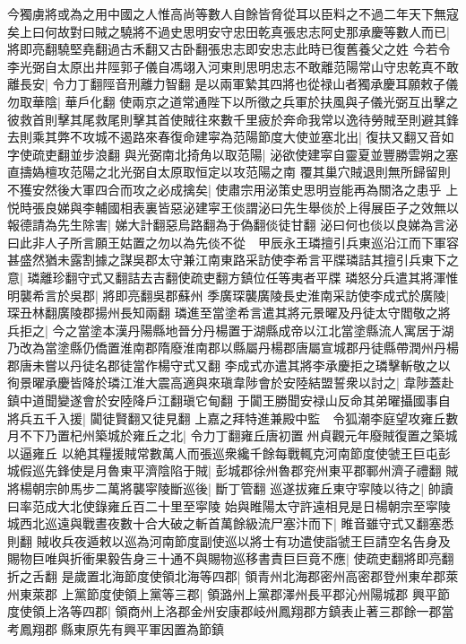 今獨虜將或為之用中國之人惟高尚等數人自餘皆脅從耳以臣料之不過二年天下無寇矣上曰何故對曰賊之驍將不過史思明安守忠田乾真張忠志阿史那承慶等數人而已|{
	將即亮翻驍堅堯翻過古禾翻又古卧翻張忠志即安忠志此時已復舊養父之姓}
今若令李光弼自太原出井陘郭子儀自馮翊入河東則思明忠志不敢離范陽常山守忠乾真不敢離長安|{
	令力丁翻陘音刑離力智翻}
是以兩軍縶其四將也從禄山者獨承慶耳願敕子儀勿取華陰|{
	華戶化翻}
使兩京之道常通陛下以所徵之兵軍於扶風與子儀光弼互出擊之彼救首則擊其尾救尾則擊其首使賊往來數千里疲於奔命我常以逸待勞賊至則避其鋒去則乘其弊不攻城不遏路來春復命建寜為范陽節度大使並塞北出|{
	復扶又翻又音如字使疏吏翻並步浪翻}
與光弼南北掎角以取范陽|{
	泌欲使建寜自靈夏並豐勝雲朔之塞直擣媯檀攻范陽之北光弼自太原取恒定以攻范陽之南}
覆其巢穴賊退則無所歸留則不獲安然後大軍四合而攻之必成擒矣|{
	使肅宗用泌策史思明豈能再為關洛之患乎}
上悦時張良娣與李輔國相表裏皆惡泌建寜王倓謂泌曰先生舉倓於上得展臣子之效無以報德請為先生除害|{
	娣大計翻惡烏路翻為于偽翻倓徒甘翻}
泌曰何也倓以良娣為言泌曰此非人子所言願王姑置之勿以為先倓不從　甲辰永王璘擅引兵東巡沿江而下軍容甚盛然猶未露割據之謀吳郡太守兼江南東路采訪使李希言平牒璘詰其擅引兵東下之意|{
	璘離珍翻守式又翻詰去吉翻使疏吏翻方鎮位任等夷者平牒}
璘怒分兵遣其將渾惟明襲希言於吳郡|{
	將即亮翻吳郡蘇州}
季廣琛襲廣陵長史淮南采訪使李成式於廣陵|{
	琛丑林翻廣陵郡揚州長知兩翻}
璘進至當塗希言遣其將元景曜及丹徒太守閻敬之將兵拒之|{
	今之當塗本漢丹陽縣地晉分丹楊置于湖縣成帝以江北當塗縣流人寓居于湖乃改為當塗縣仍僑置淮南郡隋廢淮南郡以縣屬丹楊郡唐屬宣城郡丹徒縣帶潤州丹楊郡唐未嘗以丹徒名郡徒當作楊守式又翻}
李成式亦遣其將李承慶拒之璘擊斬敬之以徇景曜承慶皆降於璘江淮大震高適與來瑱韋陟會於安陸結盟誓衆以討之|{
	韋陟蓋赴鎮中道聞變遂會於安陸降戶江翻瑱它甸翻}
于闐王勝聞安禄山反命其弟曜攝國事自將兵五千入援|{
	闐徒賢翻又徒見翻}
上嘉之拜特進兼殿中監　令狐潮李庭望攻雍丘數月不下乃置杞州築城於雍丘之北|{
	令力丁翻雍丘唐初置州貞觀元年廢賊復置之築城以逼雍丘}
以絶其糧援賊常數萬人而張巡衆纔千餘每戰輒克河南節度使虢王巨屯彭城假巡先鋒使是月魯東平濟陰陷于賊|{
	彭城郡徐州魯郡兖州東平郡鄆州濟子禮翻}
賊將楊朝宗帥馬步二萬將襲寜陵斷巡後|{
	斷丁管翻}
巡遂拔雍丘東守寜陵以待之|{
	帥讀曰率范成大北使錄雍丘百二十里至寜陵}
始與睢陽太守許遠相見是日楊朝宗至寜陵城西北巡遠與戰晝夜數十合大破之斬首萬餘級流尸塞汴而下|{
	睢音雖守式又翻塞悉則翻}
賊收兵夜遁敕以巡為河南節度副使巡以將士有功遣使詣虢王巨請空名告身及賜物巨唯與折衝果毅告身三十通不與賜物巡移書責巨巨竟不應|{
	使疏吏翻將即亮翻折之舌翻}
是歲置北海節度使領北海等四郡|{
	領青州北海郡密州高密郡登州東牟郡萊州東萊郡}
上黨節度使領上黨等三郡|{
	領潞州上黨郡澤州長平郡沁州陽城郡}
興平節度使領上洛等四郡|{
	領商州上洛郡金州安康郡岐州鳳翔郡方鎮表止著三郡餘一郡當考鳳翔郡縣東原先有興平軍因置為節鎮}

